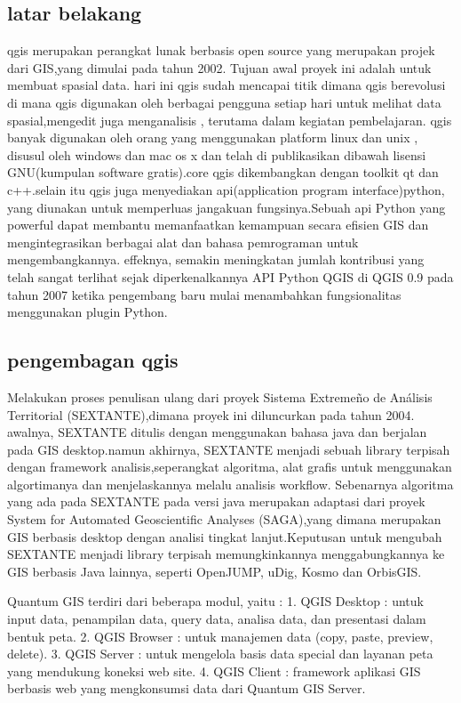  \subsection{latar belakang}
 qgis merupakan perangkat lunak berbasis open source yang merupakan projek dari GIS,yang dimulai pada tahun 2002. Tujuan awal proyek ini adalah untuk membuat spasial data. hari ini qgis sudah mencapai titik dimana qgis berevolusi di mana qgis digunakan oleh berbagai pengguna setiap hari untuk melihat data spasial,mengedit juga menganalisis , terutama dalam kegiatan pembelajaran.
 qgis banyak digunakan oleh orang yang menggunakan platform linux dan unix , disusul oleh windows dan mac os x dan telah di publikasikan dibawah lisensi GNU(kumpulan software gratis).core qgis dikembangkan dengan toolkit qt dan c++.selain itu qgis juga menyediakan api(application program interface)python, yang diunakan untuk memperluas jangakuan fungsinya.Sebuah api Python yang powerful dapat membantu memanfaatkan kemampuan secara efisien GIS dan mengintegrasikan berbagai alat dan bahasa pemrograman untuk mengembangkannya. 
 effeknya, semakin meningkatan jumlah kontribusi yang telah sangat terlihat sejak diperkenalkannya API Python QGIS di QGIS 0.9 pada tahun 2007 ketika pengembang baru mulai menambahkan fungsionalitas menggunakan plugin Python.
 
 \subsection{pengembagan qgis}
 Melakukan proses penulisan ulang dari proyek Sistema Extremeño de Análisis Territorial (SEXTANTE),dimana proyek ini diluncurkan pada tahun 2004. awalnya, SEXTANTE ditulis dengan menggunakan bahasa java dan berjalan pada GIS desktop.namun akhirnya, SEXTANTE menjadi sebuah library terpisah dengan framework analisis,seperangkat algoritma, alat grafis untuk menggunakan algortimanya dan menjelaskannya melalu analisis workflow.
 Sebenarnya algoritma yang ada pada SEXTANTE pada versi java merupakan adaptasi dari proyek System for Automated Geoscientific Analyses (SAGA),yang dimana merupakan GIS berbasis desktop dengan analisi tingkat lanjut.Keputusan untuk mengubah SEXTANTE menjadi library terpisah memungkinkannya menggabungkannya ke GIS berbasis Java lainnya, seperti OpenJUMP, uDig, Kosmo dan OrbisGIS.   

Quantum GIS terdiri dari beberapa modul, yaitu :
1.	QGIS Desktop : untuk input data, penampilan data, query data, analisa data, dan presentasi dalam bentuk peta.
2.	QGIS Browser : untuk manajemen data (copy, paste, preview, delete).
3.	QGIS Server : untuk mengelola basis data special dan layanan peta yang mendukung koneksi web site.
4.	QGIS Client : framework aplikasi GIS berbasis web yang mengkonsumsi data dari Quantum GIS Server.


